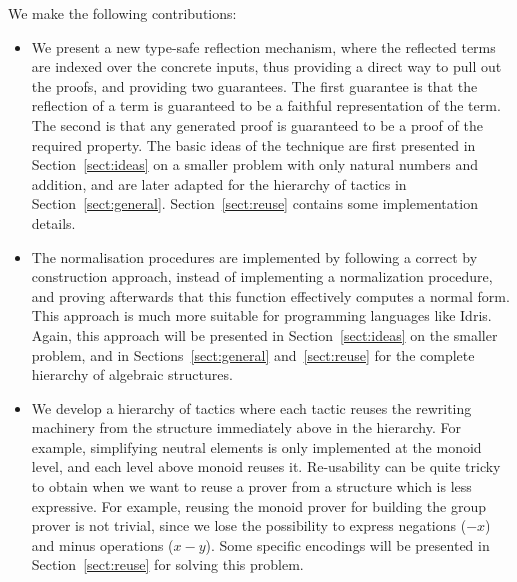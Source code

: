 We make the following contributions:

\begin{itemize}
        \item We present a new type-safe reflection mechanism, where the
        reflected terms are indexed over the concrete inputs, thus providing a
        direct way to pull out the proofs, and providing two guarantees.
        The first guarantee is that the reflection of a term is guaranteed to be a
        faithful representation of the term. The second is that any generated
        proof is guaranteed to be a proof of the required property. The basic
        ideas of the technique are first presented in Section~\ref{sect:ideas} on a
        smaller problem with only natural numbers and addition, and are later
        adapted for the hierarchy of tactics in Section~\ref{sect:general}. 
        Section~\ref{sect:reuse} contains some implementation details.	

        \item The normalisation procedures are implemented by following a
        correct by construction approach, instead of implementing a
        normalization procedure, and proving afterwards that this function
        effectively computes a normal form. This approach is much more suitable
        for programming languages like Idris. Again, this approach will be
        presented in Section~\ref{sect:ideas} on the smaller problem, 
        and in Sections~\ref{sect:general} and~\ref{sect:reuse}
        for the complete hierarchy of algebraic structures.

        \item We develop a hierarchy of tactics where each tactic reuses the
        rewriting machinery from the structure immediately above in the hierarchy.
        For example,
        simplifying neutral elements is only implemented at the monoid level,
        and each level above monoid reuses it. Re-usability can be quite tricky
        to obtain when we want to reuse a prover from a structure which is less
        expressive. For example, reusing the monoid prover for building the
        group prover is not trivial, since we lose the possibility to express
        negations ($-x$) and minus operations ($x-y$). Some specific encodings
        will be presented in Section~\ref{sect:reuse} for solving this problem.

\end{itemize}
